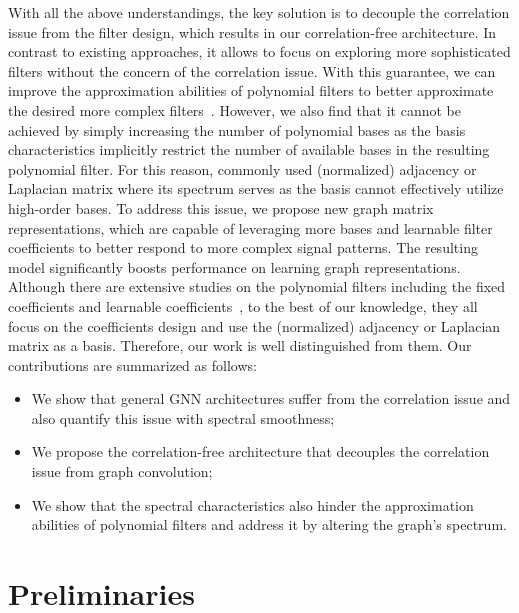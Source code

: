 \documentclass[nohyperref]{article}
\theoremstyle{plain}
\theoremstyle{definition}
\theoremstyle{remark}
\begin{document}
With all the above understandings, the key solution is to decouple the correlation issue from the filter design, which results in our correlation-free architecture. In contrast to existing approaches, it allows to focus on exploring more sophisticated filters without the concern of the correlation issue. With this guarantee, we can improve the approximation abilities of polynomial filters to better approximate the desired more complex filters~\cite{hammond2011wavelets,defferrard2016convolutional}.
However, we also find that it cannot be achieved by simply increasing the number of polynomial bases as the basis characteristics implicitly restrict the number of available bases in the resulting polynomial filter. For this reason, commonly used (normalized) adjacency or Laplacian matrix where its spectrum serves as the basis cannot effectively utilize high-order bases. To address this issue, we propose new graph matrix representations, which are capable of leveraging more bases and learnable filter coefficients to better respond to more complex signal patterns. The resulting model significantly boosts performance on learning graph representations. Although there are extensive studies on the polynomial filters including the fixed coefficients and learnable coefficients~\cite{defferrard2016convolutional,8521593,chien2021adaptive,he2021bernnet}, to the best of our knowledge, they all focus on the coefficients design and use the (normalized) adjacency or Laplacian matrix as a basis. Therefore, our work is well distinguished from them.
Our contributions are summarized as follows:
\begin{itemize}
	\item 
	\vspace{-5pt}
	We show that general GNN architectures suffer from the correlation issue and also quantify this issue with spectral smoothness;
	\item
	\vspace{-5pt}
	We propose the correlation-free architecture that decouples the correlation issue from graph convolution;
	\item
	\vspace{-5pt}
	We show that the spectral characteristics also hinder the approximation abilities of polynomial filters and address it by altering the graph's spectrum.
\end{itemize}

\section{Preliminaries}
\end{document}
